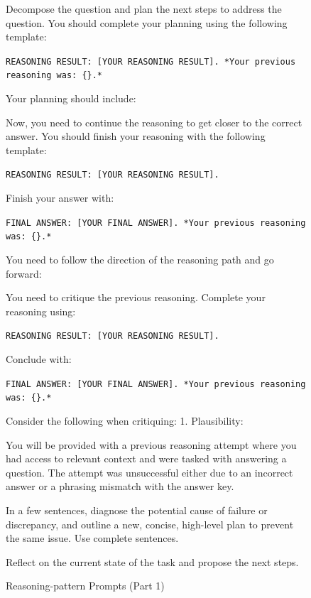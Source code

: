 \documentclass{article}
\begin{document}
\begin{figure}[htbp]
\centering
{}
\caption{Reasoning-pattern Prompts (Part 1)}
\label{actions_2}
\begin{tcolorbox}[title={planning}]
Decompose the question and plan the next steps to address the question. You should complete your planning using the following template:

\texttt{REASONING RESULT: [YOUR REASONING RESULT]. *Your previous reasoning was: \{\}.*}

Your planning should include:
\end{tcolorbox}

\begin{tcolorbox}[title={reasoning}]
Now, you need to continue the reasoning to get closer to the correct answer. You should finish your reasoning with the following template:

\texttt{REASONING RESULT: [YOUR REASONING RESULT].}

Finish your answer with:

\texttt{FINAL ANSWER: [YOUR FINAL ANSWER]. *Your previous reasoning was: \{\}.*}

You need to follow the direction of the reasoning path and go forward:
\end{tcolorbox}

\begin{tcolorbox}[title={critique}]
You need to critique the previous reasoning. Complete your reasoning using:

\texttt{REASONING RESULT: [YOUR REASONING RESULT].}

Conclude with:

\texttt{FINAL ANSWER: [YOUR FINAL ANSWER]. *Your previous reasoning was: \{\}.*}

Consider the following when critiquing: 1. Plausibility:
\end{tcolorbox}

\begin{tcolorbox}[title={reflect}]
You will be provided with a previous reasoning attempt where you had access to relevant context and were tasked with answering a question. The attempt was unsuccessful either due to an incorrect answer or a phrasing mismatch with the answer key.

In a few sentences, diagnose the potential cause of failure or discrepancy, and outline a new, concise, high-level plan to prevent the same issue. Use complete sentences.

Reflect on the current state of the task and propose the next steps.


\end{tcolorbox}
\end{figure}
\end{document}
